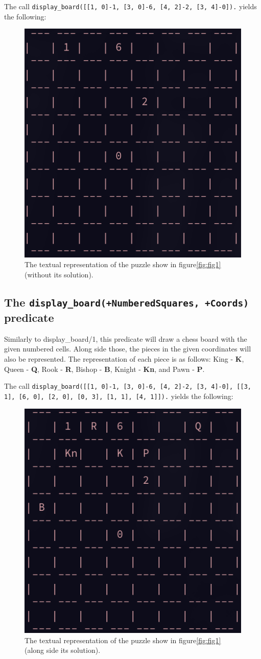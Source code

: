 \documentclass[runningheads]{llncs}
\newcommand{\inlinecode}[1]{\texttt{#1}}
\begin{document}
The call \inlinecode{display\_board([[1, 0]-1, [3, 0]-6, [4, 2]-2, [3, 4]-0]).}
yields the following:
\begin{figure}[H]
  \centering
  \includegraphics[width=0.4\linewidth]{figures/display_board_1.png}
  \caption{The textual representation of the puzzle show in figure\ref{fig:fig1}
  (without its solution).}\label{fig:fig2}
\end{figure}

\subsection{The \inlinecode{display\_board(+NumberedSquares, +Coords)} predicate}

Similarly to display\_board/1, this predicate will draw a chess board with the given
numbered cells. Along side those, the pieces in the given coordinates will also be
represented. The representation of each piece is as follows: King - \textbf{K},
Queen - \textbf{Q}, Rook - \textbf{R}, Bishop - \textbf{B}, Knight - \textbf{Kn},
and Pawn - \textbf{P}.

The call \inlinecode{display\_board([[1, 0]-1, [3, 0]-6, [4, 2]-2, [3, 4]-0],
[[3, 1], [6, 0], [2, 0], [0, 3], [1, 1], [4, 1]]).} yields the following:
\begin{figure}[H]
\includegraphics[width=0.4\linewidth]{figures/display_board_2.png}
  \centering
  \caption{The textual representation of the puzzle show in figure\ref{fig:fig1}
  (along side its solution).}\label{fig:fig3}
\end{figure}
\end{document}
